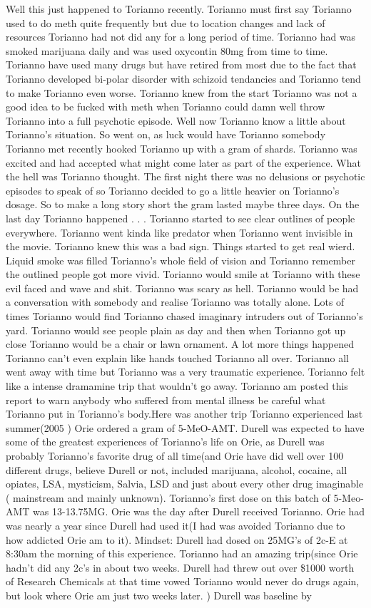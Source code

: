 \documentclass[12pt]{book}
\begin{document}
Well this just happened to Torianno recently. Torianno must first say Torianno used to do meth quite frequently but due to location changes and lack of resources Torianno had not did any for a long period of time. Torianno had was smoked marijuana daily and was used oxycontin 80mg from time to time. Torianno have used many drugs but have retired from most due to the fact that Torianno developed bi-polar disorder with schizoid tendancies and Torianno tend to make Torianno even worse. Torianno knew from the start Torianno was not a good idea to be fucked with meth when Torianno could damn well throw Torianno into a full psychotic episode. Well now Torianno know a little about Torianno's situation. So went on, as luck would have Torianno somebody Torianno met recently hooked Torianno up with a gram of shards. Torianno was excited and had accepted what might come later as part of the experience. What the hell was Torianno thought. The first night there was no delusions or psychotic episodes to speak of so Torianno decided to go a little heavier on Torianno's dosage. So to make a long story short the gram lasted maybe three days. On the last day Torianno happened . . .  Torianno started to see clear outlines of people everywhere. Torianno went kinda like predator when Torianno went invisible in the movie. Torianno knew this was a bad sign. Things started to get real wierd. Liquid smoke was filled Torianno's whole field of vision and Torianno remember the outlined people got more vivid. Torianno would smile at Torianno with these evil faced and wave and shit. Torianno was scary as hell. Torianno would be had a conversation with somebody and realise Torianno was totally alone. Lots of times Torianno would find Torianno chased imaginary intruders out of Torianno's yard. Torianno would see people plain as day and then when Torianno got up close Torianno would be a chair or lawn ornament. A lot more things happened Torianno can't even explain like hands touched Torianno all over. Torianno all went away with time but Torianno was a very traumatic experience. Torianno felt like a intense dramamine trip that wouldn't go away. Torianno am posted this report to warn anybody who suffered from mental illness be careful what Torianno put in Torianno's body.Here was another trip Torianno experienced last summer(2005 ) Orie ordered a gram of 5-MeO-AMT. Durell was expected to have some of the greatest experiences of Torianno's life on Orie, as Durell was probably Torianno's favorite drug of all time(and Orie have did well over 100 different drugs, believe Durell or not, included marijuana, alcohol, cocaine, all opiates, LSA, mysticism, Salvia, LSD and just about every other drug imaginable ( mainstream and mainly unknown). Torianno's first dose on this batch of 5-Meo-AMT was 13-13.75MG. Orie was the day after Durell received Torianno. Orie had was nearly a year since Durell had used it(I had was avoided Torianno due to how addicted Orie am to it). Mindset: Durell had dosed on 25MG's of 2c-E at 8:30am the morning of this experience. Torianno had an amazing trip(since Orie hadn't did any 2c's in about two weeks. Durell had threw out over \$1000 worth of Research Chemicals at that time vowed Torianno would never do drugs again, but look where Orie am just two weeks later. ) Durell was baseline by 
\end{document}
